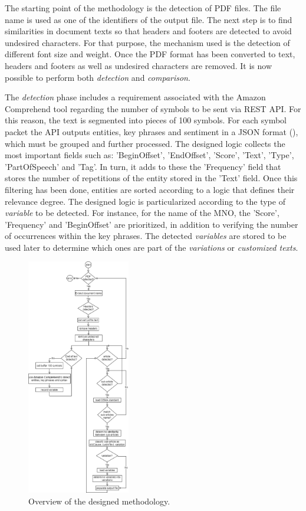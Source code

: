 \documentclass[conference]{style/IEEEtran}
\begin{document}
The starting point of the methodology is the detection of PDF files. The file name is used as one of the identifiers of the output file. The next step is to find similarities in document texts so that headers and footers are detected to avoid undesired characters. For that purpose, the mechanism used is the detection of different font size and weight. Once the PDF format has been converted to text, headers and footers as well as undesired characters are removed. It is now possible to perform both \textit{detection} and \textit{comparison}.

The \textit{detection} phase includes a requirement associated with the Amazon Comprehend tool regarding the number of symbols to be sent via REST API. For this reason, the text is segmented into pieces of 100 symbols. For each symbol packet the API outputs entities, key phrases and sentiment in a JSON format (\cite{AWS2021}), which must be grouped and further processed. The designed logic collects the most important fields such as: 'BeginOffset', 'EndOffset', 'Score', 'Text', 'Type', 'PartOfSpeech' and 'Tag'. In turn, it adds to these the 'Frequency' field that stores the number of repetitions of the entity stored in the 'Text' field. Once this filtering has been done, entities are sorted according to a logic that defines their relevance degree. The designed logic is particularized according to the type of \textit{variable} to be detected. For instance, for the name of the MNO, the 'Score', 'Frequency' and 'BeginOffset' are prioritized, in addition to verifying the number of occurrences within the key phrases. The detected \textit{variables} are stored to be used later to determine which ones are part of the \textit{variations} or \textit{customized texts}.

\begin{figure}[htbp]
\centerline{\includegraphics[width=0.4\textwidth]{images/methodology.png}}
\caption{Overview of the designed methodology.}
\label{fig1}
\end{figure}
\end{document}
